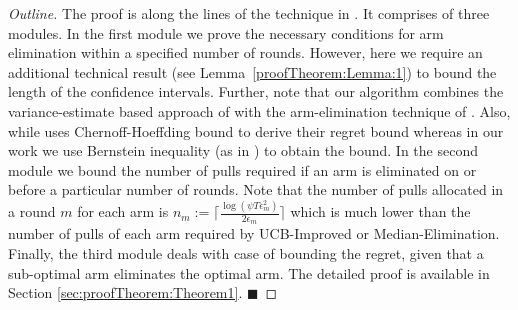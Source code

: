 \begin{proof}[Outline]
The proof is along the lines of the technique in \cite{auer2010ucb}. It comprises of three modules. In the first module we prove the necessary conditions for arm elimination within a specified number of rounds. However, here we require an additional technical result (see Lemma~\ref{proofTheorem:Lemma:1}) to bound the length of the confidence intervals. Further, note that our algorithm combines the variance-estimate based approach of \cite{audibert2009exploration} with the arm-elimination technique of  \cite{auer2010ucb}. Also, while \cite{auer2010ucb} uses Chernoff-Hoeffding bound to derive their regret bound whereas in our work we use  Bernstein inequality (as in \cite{audibert2009exploration}) to obtain the bound.  
% 
In the second module we bound the number of pulls required if an arm is eliminated on or before a particular number of rounds. Note that the number of pulls allocated in a round $m$ for each arm is $n_{m}:=\bigg\lceil\frac{\log{(\psi T\epsilon_{m}^{2})}}{2\epsilon_{m}}\bigg\rceil$ which is much lower than the number of pulls of each arm required by UCB-Improved or Median-Elimination. Finally, the third module deals with case of bounding the regret, given that a sub-optimal arm eliminates the optimal arm. The detailed proof is available in Section \ref{sec:proofTheorem:Theorem1}.
\hfill $\blacksquare$
\end{proof}



